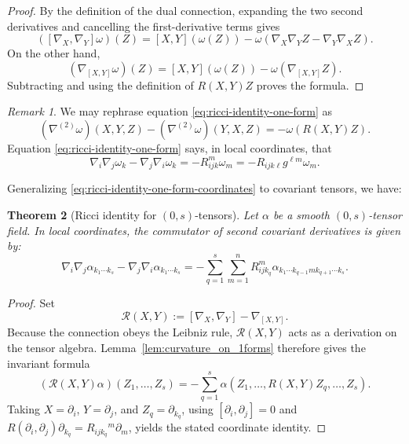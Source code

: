 \documentclass[11pt]{article}
\theoremstyle{plain}
\newtheorem{theorem}{Theorem}[section]
\theoremstyle{definition}
\theoremstyle{remark}
\newtheorem{remark}[theorem]{Remark}
\begin{document}
\begin{proof}
By the definition of the dual connection, expanding the two second derivatives
and cancelling the first-derivative terms gives
\[
([\nabla_X,\nabla_Y]\omega)(Z)
=[X,Y](\omega(Z))
-\omega(\nabla_X\nabla_YZ-\nabla_Y\nabla_XZ).
\]
On the other hand,
\[
(\nabla_{[X,Y]}\omega)(Z)
=[X,Y](\omega(Z))-\omega(\nabla_{[X,Y]}Z).
\]
Subtracting and using the definition of $R(X,Y)Z$ proves the formula.
\end{proof}

\begin{remark}
We may rephrase equation \eqref{eq:ricci-identity-one-form} as
\begin{equation}
    (\nabla^{(2)} \omega)(X, Y, Z)
- (\nabla^{(2)} \omega)(Y, X, Z) = - \omega(R(X,Y)Z).
\end{equation}
Equation \eqref{eq:ricci-identity-one-form} says, in local coordinates, that
\begin{equation}\label{eq:ricci-identity-one-form-coordinates}
    \nabla_i \nabla_j \omega_k - \nabla_j \nabla_i \omega_k = - R_{ijk}^m \omega_m = - R_{ijk\ell}g^{\ell m} \omega_m .
\end{equation}
\end{remark}

Generalizing \eqref{eq:ricci-identity-one-form-coordinates} to covariant
tensors, we have:

\begin{theorem}[Ricci identity for $(0,s)$-tensors]
\label{thm:ricci_identity}
    Let $\alpha$ be a smooth $(0,s)$-tensor field. In local coordinates, the commutator of second covariant derivatives is given by:
    \begin{equation}
        \nabla_{i}\nabla_{j}\alpha_{k_{1}\cdots k_{s}} - \nabla_{j}\nabla_{i}\alpha_{k_{1}\cdots k_{s}}
        = - \sum_{q=1}^{s} \sum_{m=1}^n R_{ijk_{q}}^{m} \alpha_{k_{1}\cdots k_{q-1} m k_{q+1}\cdots k_{s}}.
    \end{equation}
\end{theorem}

\begin{proof}
Set
\[
\mathcal R(X,Y):=[\nabla_X,\nabla_Y]-\nabla_{[X,Y]}.
\]
Because the connection obeys the Leibniz rule, $\mathcal R(X,Y)$ acts as a
derivation on the tensor algebra.  Lemma~\ref{lem:curvature_on_1forms} therefore
gives the invariant formula
\[
(\mathcal R(X,Y)\alpha)(Z_1,\dots,Z_s)
=-\sum_{q=1}^s
\alpha(Z_1,\dots,R(X,Y)Z_q,\dots,Z_s).
\]
Taking $X=\partial_i$, $Y=\partial_j$, and $Z_q=\partial_{k_q}$, using
$[\partial_i,\partial_j]=0$ and
$R(\partial_i,\partial_j)\partial_{k_q}
=R_{ijk_q}{}^m\partial_m$, yields the stated coordinate identity.
\end{proof}
\end{document}
